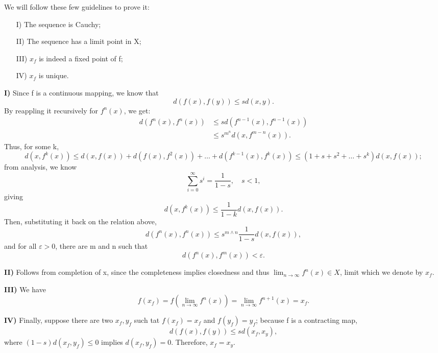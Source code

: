 \documentclass[../fractals_everywhere.tex]{subfiles}
\begin{document}
\begin{proof*}
	We will follow these few guidelines to prove it:
	\begin{itemize}
		\item[I)] The sequence is Cauchy;
		\item[II)] The sequence has a limit point in X;
		\item[III)] \(x_{f}\) is indeed a fixed point of f;
		\item[IV)] \(x_{f}\) is unique.
	\end{itemize}

	\textbf{I)} Since f is a continuous mapping, we know that
	\[
		d(f(x), f(y))\leq s d(x, y).
	\]
	By reappling it recursively for \(f^{n}(x)\), we get:
	\begin{align*}
		d(f^{n}(x), f^{n}(x)) & \leq sd(f^{n-1}(x), f^{n-1}(x)) \\
		                      & \leq s^{m^n}d(x, f^{m-n}(x)).
	\end{align*}
	Thus, for some k,
	\[
		d(x, f^{k}(x))\leq d(x, f(x))+d(f(x), f^{2}(x))+\dotsc +d(f^{k-1}(x), f^{k}(x)) \leq (1+s+s^{2}+\dotsc +s^{k})d(x, f(x));
	\]
	from analysis, we know
	\[
		\sum\limits_{i=0}^{\infty}s^{i} = \frac{1}{1-s}, \quad s< 1,
	\]
	giving
	\[
		d(x, f^{k}(x)) \leq \frac{1}{1-k}d(x, f(x)).
	\]
	Then, substituting it back on the relation above,
	\[
		d(f^{n}(x), f^{n}(x)) \leq s^{m \wedge n}\frac{1}{1-s}d(x, f(x)),
	\]
	and for all \(\varepsilon  > 0\), there are m and n such that
	\[
		d(f^{n}(x), f^{m}(x))<\varepsilon .
	\]

	\textbf{II)} Follows from completion of x, since the completeness implies closedness and thus \(\lim_{n\to \infty}f^{n}(x)\in X\), limit which we denote by \(x_{f}\).

	\textbf{III)} We have
	\[
		f(x_{f})=f(\lim_{n\to \infty}f^{n}(x)) = \lim_{n\to \infty}f^{n+1}(x) = x_{f}.
	\]

	\textbf{IV)} Finally, suppose there are two \(x_{f}, y_{f}\) such tat \(f(x_{f}) = x_{f}\) and \(f(y_{f}) = y_{f}\); because f is a contracting map,
	\[
		d(f(x), f(y))\leq sd(x_{f}, x_{y}),
	\]
	where \((1-s)d(x_{f}, y_{f})\leq 0\) implies \(d(x_{f}, y_{f})=0\). Therefore, \(x_{f} = x_{y}.\) \qedsymbol

\end{proof*}
\end{document}
